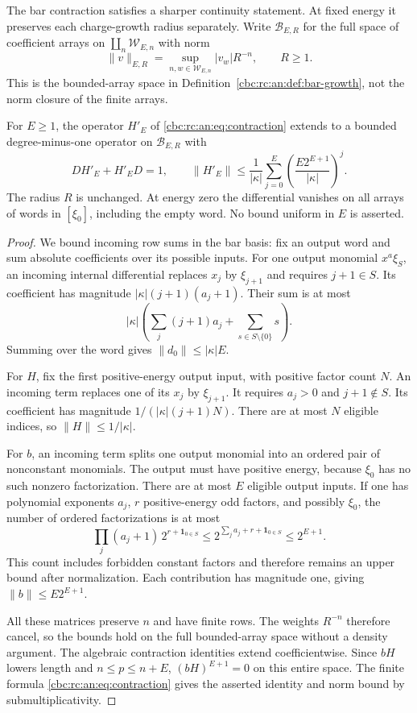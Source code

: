 The bar contraction satisfies a sharper continuity statement.
At fixed energy it preserves each charge-growth radius separately.
Write $\mathcal B_{E,R}$ for the full space of coefficient arrays
on $\coprod_n\mathcal W_{E,n}$ with norm
\[
 \|v\|_{E,R}=\sup_{n,w\in\mathcal W_{E,n}}|v_w|R^{-n},
 \qquad R\geq1.
\]
This is the bounded-array space in
Definition~\ref{cbc:rc:an:def:bar-growth}, not the norm closure of the
finite arrays.

\begin{theorem}\label{cbc:rc:an:thm:fixed-radius}
For $E\geq1$, the operator $H'_E$ of
\eqref{cbc:rc:an:eq:contraction} extends to a bounded degree-minus-one
operator on $\mathcal B_{E,R}$ with
\[
 DH'_E+H'_ED=1,\qquad
 \|H'_E\|\leq\frac1{|\kappa|}
 \sum_{j=0}^{E}\left(\frac{E2^{E+1}}{|\kappa|}\right)^j.
\]
The radius $R$ is unchanged. At energy zero the differential
vanishes on all arrays of words in $[\xi_0]$, including the empty
word. No bound uniform in $E$ is asserted.
\end{theorem}
\begin{proof}
We bound incoming row sums in the bar basis: fix an output word
and sum absolute coefficients over its possible inputs.
For one output monomial $x^a\xi_S$, an incoming internal
differential replaces $x_j$ by $\xi_{j+1}$ and requires
$j+1\in S$. Its coefficient has magnitude
$|\kappa|(j+1)(a_j+1)$.
Their sum is at most
\[
 |\kappa|\left(\sum_j(j+1)a_j+
                    \sum_{s\in S\setminus\{0\}}s\right).
\]
Summing over the word gives $\|d_0\|\leq|\kappa|E$.

For $H$, fix the first positive-energy output input, with
positive factor count $N$. An incoming term replaces one of
its $x_j$ by $\xi_{j+1}$. It requires $a_j>0$ and
$j+1\notin S$. Its coefficient has magnitude
$1/(|\kappa|(j+1)N)$. There are at most $N$ eligible indices,
so $\|H\|\leq1/|\kappa|$.

For $b$, an incoming term splits one output monomial into an
ordered pair of nonconstant monomials. The output must have
positive energy, because $\xi_0$ has no such nonzero
factorization. There are at most $E$ eligible output inputs.
If one has polynomial exponents $a_j$, $r$ positive-energy odd
factors, and possibly $\xi_0$, the number of ordered
factorizations is at most
\[
 \prod_j(a_j+1)\,2^{r+\mathbf1_{0\in S}}
 \leq2^{\sum_j a_j+r+\mathbf1_{0\in S}}
 \leq2^{E+1}.
\]
This count includes forbidden constant factors and therefore
remains an upper bound after normalization. Each contribution
has magnitude one, giving $\|b\|\leq E2^{E+1}$.

All these matrices preserve $n$ and have finite rows. The
weights $R^{-n}$ therefore cancel, so the bounds hold on the
full bounded-array space without a density argument.
The algebraic contraction identities extend coefficientwise.
Since $bH$ lowers length and $n\leq p\leq n+E$,
$(bH)^{E+1}=0$ on this entire space. The finite formula
\eqref{cbc:rc:an:eq:contraction} gives the asserted identity and norm
bound by submultiplicativity.
\end{proof}

